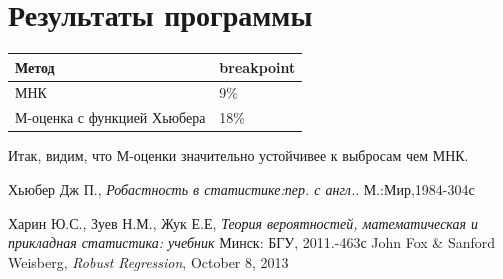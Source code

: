 \documentclass[12pt]{article}
\begin{document}
\section{Результаты программы}
\begin{tabular}{|p{3cm}|p{10cm}|}
    \hline
    Метод&breakpoint\\
    \hline
    МНК & 9\%\\
    М-оценка с функцией Хьюбера& 18\%\\
    \hline
\end{tabular}\hfill\break
Итак, видим, что М-оценки значительно устойчивее к выбросам чем МНК.\hfill\break 
\newpage
\begin{thebibliography}{9}
    Хьюбер Дж П.,
    \textit{Робастность в статистике:пер. с англ.}.
    М.:Мир,1984-304с

    Харин Ю.С., Зуев Н.М., Жук Е.Е,
    \textit{Теория вероятностей, математическая и прикладная статистика: учебник}
    Минск: БГУ, 2011.-463с
    John Fox \& Sanford Weisberg,
    \textit{Robust Regression},
    October 8, 2013
\end{thebibliography}
\end{document}
